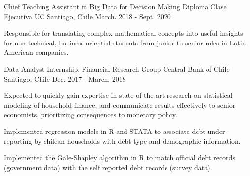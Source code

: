 \begin{cventries}
\cventry
{Chief Teaching Assistant in Big Data for Decision Making Diploma}
{Clase Ejecutiva UC} %
{Santiago, Chile} %
{March. 2018 - Sept. 2020} %
{
  \begin{cvitems} %
    \item {Responsible for translating complex mathematical concepts into useful insights for non-technical, business-oriented 
    students from junior to senior roles in Latin American companies.}
  \end{cvitems}
}

  \cventry
    {Data Analyst Internship, Financial Research Group} %
    {Central Bank of Chile} %
    {Santiago, Chile} %
    {Dec. 2017 - March. 2018} %
    {
      \begin{cvitems} %
        \item {Expected to quickly gain expertise in state-of-the-art research on statistical modeling of household finance, and communicate results effectively to senior economists, prioritizing consequences to monetary policy.}
        \item {Implemented regression models in R and STATA to associate debt under-reporting by chilean households with debt-type and demographic information.}
        \item {Implemented the Gale-Shapley algorithm in R to match official debt records (government data) with the self reported debt records (survey data).}
      \end{cvitems}
    }
\end{cventries}

